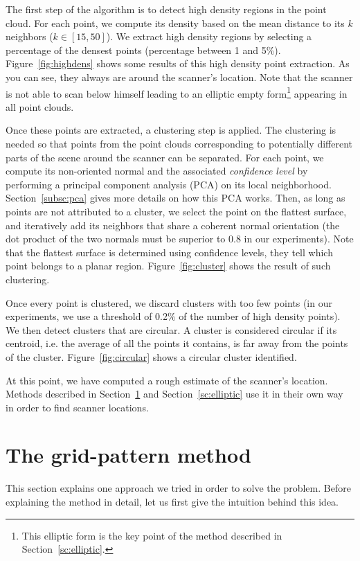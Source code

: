 The first step of the algorithm is to detect high density regions in the point cloud. For each point, we compute its density based on the mean distance to its $k$ neighbors ($k \in [15,50]$). We extract high density regions by selecting a percentage of the densest points (percentage between 1 and 5\%). Figure~\ref{fig:highdens} shows some results of this high density point extraction. As you can see, they always are around the scanner's location. Note that the scanner is not able to scan below
himself leading to an elliptic empty form\footnote{This elliptic form is the key point of the method described in Section~\ref{sc:elliptic}.} appearing in all point clouds.

Once these points are extracted, a clustering step is applied. The clustering is needed so that points from the point clouds corresponding to potentially different parts of the scene around the scanner can be separated. For each point, we compute its non-oriented normal and the associated \emph{confidence level} by performing a principal component analysis (PCA) on its local neighborhood. Section~\ref{subsc:pca} gives more details on how this PCA works. Then, as long as points are not attributed
to a cluster, we select the point on the flattest surface, and iteratively add its neighbors that share a coherent normal orientation (the dot product of the two normals must be superior to 0.8 in our experiments). Note that the  flattest surface is determined using confidence levels, they tell which point belongs to a planar region. Figure~\ref{fig:cluster} shows the result of such clustering.

Once every point is clustered, we discard clusters with too few points (in our experiments, we use a threshold of 0.2\% of the number of high density points). We then detect clusters that are circular. A cluster is considered circular if its centroid, i.e. the average of all the points it contains, is far away from the points of the cluster. Figure~\ref{fig:circular} shows a circular cluster identified.

At this point, we have computed a rough estimate of the scanner's location. Methods described in Section~\ref{sc:grid-pattern} and Section~\ref{sc:elliptic} use it in their own way in order to find scanner locations.



\section{The grid-pattern method}
\label{sc:grid-pattern}
This section explains one approach we tried in order to solve the problem. Before explaining the method in detail, let us first give the intuition behind this idea.

